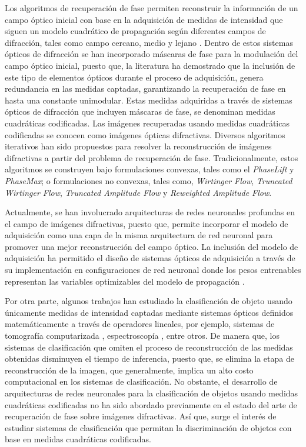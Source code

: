 Los algoritmos de recuperación de fase permiten reconstruir la información de un campo óptico inicial con base en la adquisición de medidas de intensidad que siguen un modelo cuadrático de propagación según diferentes campos de difracción, tales como campo cercano, medio y lejano \cite{goodman2005introduction}. Dentro de estos sistemas ópticos de difracción se han incorporado máscaras de fase para la modulación del campo óptico inicial, puesto que, la literatura ha demostrado que la inclusión de este tipo de elementos ópticos durante el proceso de adquisición, genera redundancia en las medidas captadas, garantizando la recuperación de fase en hasta una constante unimodular\cite{candes_CDP}. Estas medidas adquiridas a través de sistemas ópticos de difracción que incluyen máscaras de fase, se denominan medidas cuadráticas codificadas. Las imágenes recuperadas usando medidas cuadráticas codificadas se conocen como imágenes ópticas difractivas. Diversos algoritmos iterativos han sido propuestos para resolver la reconstrucción de imágenes difractivas a partir del problema de recuperación de fase. Tradicionalmente, estos algoritmos se construyen bajo formulaciones convexas, tales como el \textit{PhaseLift}\cite{candes2013phaselift} y \textit{PhaseMax}\cite{goldstein2018phasemax}; o formulaciones no convexas, tales como, \textit{Wirtinger Flow}\cite{candes2015phase}, \textit{Truncated Wirtinger Flow}\cite{chen2017solving}, \textit{Truncated Amplitude Flow}\cite{wang2017solving} y \textit{Reweighted Amplitude Flow}\cite{wang2018phase}.  

\newpage
Actualmente, se han involucrado arquitecturas de redes neuronales profundas en el campo de imágenes difractivas, puesto que, permite incorporar el modelo de adquisición como una capa de la misma arquitectura de red neuronal para promover una mejor reconstrucción del campo óptico. La inclusión del modelo de adquisición ha permitido el diseño de sistemas ópticos de adquisición a través de su implementación en configuraciones de red neuronal donde los pesos entrenables representan las variables optimizables del modelo de propagación \cite{cai2020learning}. 

Por otra parte, algunos trabajos han estudiado la clasificación de objeto usando únicamente medidas de intensidad captadas mediante sistemas ópticos definidos matemáticamente a través de operadores lineales, por ejemplo, sistemas de tomografía computarizada \cite{douarre2020value}, espectroscopía \cite{bacca2021deep}, entre otros. De manera que, los sistemas de clasificación que omiten el proceso de reconstrucción de las medidas obtenidas disminuyen el tiempo de inferencia, puesto que, se elimina la etapa de reconstrucción de la imagen, que generalmente, implica un alto costo computacional en los sistemas de clasificación. No obstante, el desarrollo de arquitecturas de redes neuronales para la clasificación de objetos usando medidas cuadráticas codificadas no ha sido abordado previamente en el estado del arte de recuperación de fase sobre imágenes difractivas. Así que, surge el interés de estudiar sistemas de clasificación que permitan la discriminación de objetos con base en medidas cuadráticas codificadas.

